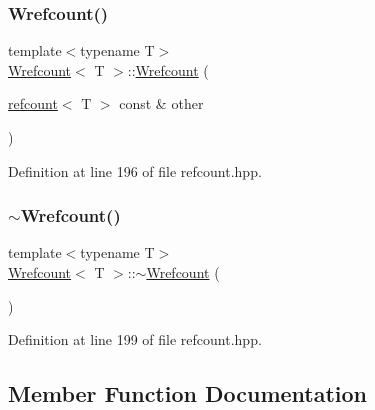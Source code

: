 \mbox{\label{classWrefcount_a04bc38d0831bd38af4e041b32f972a58}} 
\subsubsection{\texorpdfstring{Wrefcount()}{Wrefcount()}\hspace{0.1cm}{\footnotesize\ttfamily [3/3]}}
{\footnotesize\ttfamily template$<$typename T$>$ \\
\hyperlink{classWrefcount}{Wrefcount}$<$ T $>$\+::\hyperlink{classWrefcount}{Wrefcount} (\begin{DoxyParamCaption}\item[{\hyperlink{structrefcount}{refcount}$<$ T $>$ const \&}]{other }\end{DoxyParamCaption})\hspace{0.3cm}{\ttfamily [inline]}}



Definition at line 196 of file refcount.\+hpp.

\mbox{\label{classWrefcount_a22b49b818706167fd83655ebb775e04c}} 
\subsubsection{\texorpdfstring{$\sim$\+Wrefcount()}{~Wrefcount()}}
{\footnotesize\ttfamily template$<$typename T$>$ \\
\hyperlink{classWrefcount}{Wrefcount}$<$ T $>$\+::$\sim$\hyperlink{classWrefcount}{Wrefcount} (\begin{DoxyParamCaption}{ }\end{DoxyParamCaption})\hspace{0.3cm}{\ttfamily [inline]}}



Definition at line 199 of file refcount.\+hpp.



\subsection{Member Function Documentation}
\mbox{\label{classWrefcount_aeb4ad88c8369bb5d0d8da06e77146944}} 
